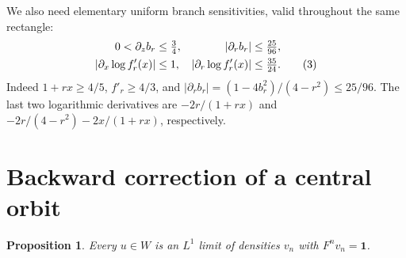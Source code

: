 \documentclass[11pt]{article}
\newtheorem{proposition}[theorem]{Proposition}
\newcommand{\one}{\mathbf 1}
\begin{document}
We also need elementary uniform branch sensitivities, valid throughout the
same rectangle:
\begin{align}
 0<\partial_z b_r&\le\tfrac34,&|\partial_r b_r|&\le\tfrac{25}{96},\notag\\
 |\partial_x\log f'_r(x)|&\le1,&
 |\partial_r\log f'_r(x)|&\le\tfrac{35}{24}.          \tag{3}\label{eq:sens}
\end{align}
Indeed $1+rx\ge4/5$, $f'_r\ge4/3$, and
$|\partial_r b_r|=(1-4b_r^2)/(4-r^2)\le25/96$.
The last two logarithmic derivatives are $-2r/(1+rx)$ and
$-2r/(4-r^2)-2x/(1+rx)$, respectively.

\section{Backward correction of a central orbit}
\begin{proposition}\label{prop:closure}
Every $u\in W$ is an $L^1$ limit of densities $v_n$ with $F^nv_n=\one$.
\end{proposition}
\end{document}
